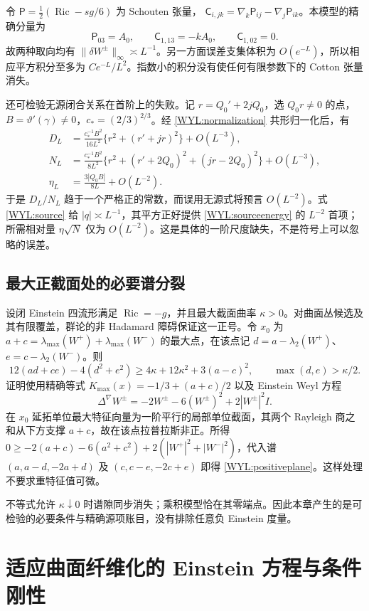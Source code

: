 \documentclass[UTF8,fontset=fandol,zihao=-4,oneside,openany]{ctexbook}
\theoremstyle{cjkplain}
\numberwithin{equation}{chapter}
\DeclareMathOperator{\Ric}{Ric}
\begin{document}
令 $\mathsf P=\frac12(\Ric-sg/6)$ 为 Schouten 张量，
$\mathsf C_{i,jk}=\nabla_k\mathsf P_{ij}-\nabla_j\mathsf P_{ik}$。本模型的精确分量为
\[
\mathsf P_{03}=A_0,\qquad \mathsf C_{1,13}=-kA_0,
\qquad \mathsf C_{1,02}=0.
\]
故两种取向均有 $\|\delta W^\pm\|_\infty\asymp L^{-1}$。另一方面误差支集体积为 $O(e^{-L})$，所以相应平方积分至多为 $Ce^{-L}/L^2$。指数小的积分没有使任何有限参数下的 Cotton 张量消失。

还可检验无源闭合关系在首阶上的失败。记 $r=Q_0'+2jQ_0$，选 $Q_0r\ne0$ 的点，$B=\vartheta'(\gamma)\ne0$，$c_*=(2/3)^{2/3}$。经 \eqref{WYL:normalization} 共形归一化后，有
\begin{align*}
D_L&=\frac{c_*^{-1}B^2}{16L^2}\{r^2+(r'+jr)^2\}+O(L^{-3}),\\
N_L&=\frac{c_*^{-1}B^2}{8L^2}
\{r^2+(r'+2Q_0)^2+(jr-2Q_0)^2\}+O(L^{-3}),\\
\eta_L&=\frac{3|Q_0B|}{8L}+O(L^{-2}).
\end{align*}
于是 $D_L/N_L$ 趋于一个严格正的常数，而误用无源式将预言 $O(L^{-2})$。式 \eqref{WYL:source} 给 $|q|\asymp L^{-1}$，其平方正好提供 \eqref{WYL:sourceenergy} 的 $L^{-2}$ 首项；所需相对量 $\eta\sqrt N$ 仅为 $O(L^{-2})$。这是具体的一阶尺度缺失，不是符号上可以忽略的误差。

\section{最大正截面处的必要谱分裂}
设闭 Einstein 四流形满足 $\Ric=-g$，并且最大截面曲率 $\kappa>0$。对曲面丛候选及其有限覆盖，群论的非 Hadamard 障碍保证这一正号。令 $x_0$ 为
$a+c=\lambda_{\max}(W^+)+\lambda_{\max}(W^-)$ 的最大点，在该点记
$d=a-\lambda_2(W^+)$、$e=c-\lambda_2(W^-)$。则
\begin{equation}\label{WYL:positiveplane}
12(ad+ce)-4(d^2+e^2)
\ge4\kappa+12\kappa^2+3(a-c)^2,
\qquad \max(d,e)>\kappa/2.
\end{equation}
证明使用精确等式 $K_{\max}(x)=-1/3+(a+c)/2$ 以及 Einstein Weyl 方程
\[
\Delta^\nabla W^\pm=-2W^\pm-6(W^\pm)^2+2|W^\pm|^2I.
\]
在 $x_0$ 延拓单位最大特征向量为一阶平行的局部单位截面，其两个 Rayleigh 商之和从下方支撑 $a+c$，故在该点拉普拉斯非正。所得
$0\ge-2(a+c)-6(a^2+c^2)+2(|W^+|^2+|W^-|^2)$，代入谱
$(a,a-d,-2a+d)$ 及 $(c,c-e,-2c+e)$ 即得 \eqref{WYL:positiveplane}。这样处理不要求重特征值可微。

不等式允许 $\kappa\downarrow0$ 时谱隙同步消失；乘积模型恰在其零端点。因此本章产生的是可检验的必要条件与精确源项账目，没有排除任意负 Einstein 度量。


\chapter{适应曲面纤维化的 Einstein 方程与条件刚性}
\label{SUB:chapter}
\end{document}
